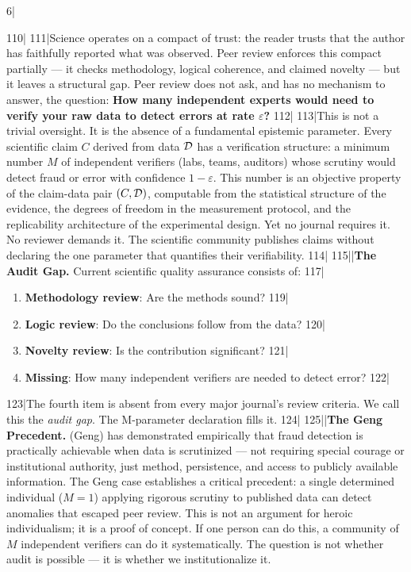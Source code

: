 6|\documentclass[12pt,a4paper]{article}
\begin{document}
110|
111|Science operates on a compact of trust: the reader trusts that the author has faithfully reported what was observed. Peer review enforces this compact partially — it checks methodology, logical coherence, and claimed novelty — but it leaves a structural gap. Peer review does not ask, and has no mechanism to answer, the question: \textbf{How many independent experts would need to verify your raw data to detect errors at rate $\varepsilon$?}
112|
113|This is not a trivial oversight. It is the absence of a fundamental epistemic parameter. Every scientific claim $C$ derived from data $\mathcal{D}$ has a verification structure: a minimum number $M$ of independent verifiers (labs, teams, auditors) whose scrutiny would detect fraud or error with confidence $1-\varepsilon$. This number is an objective property of the claim-data pair $(C, \mathcal{D})$, computable from the statistical structure of the evidence, the degrees of freedom in the measurement protocol, and the replicability architecture of the experimental design. Yet no journal requires it. No reviewer demands it. The scientific community publishes claims without declaring the one parameter that quantifies their verifiability.
114|
115||\noindent\textbf{The Audit Gap.} Current scientific quality assurance consists of:
117|\begin{enumerate}[label=(\roman*)]
118|    \item \textbf{Methodology review}: Are the methods sound?
119|    \item \textbf{Logic review}: Do the conclusions follow from the data?
120|    \item \textbf{Novelty review}: Is the contribution significant?
121|    \item \textbf{Missing}: How many independent verifiers are needed to detect error?
122|\end{enumerate}
123|The fourth item is absent from every major journal's review criteria. We call this the \textit{audit gap}. The M-parameter declaration fills it.
124|
125||\noindent\textbf{The Geng Precedent.}  (Geng) has demonstrated empirically that fraud detection is practically achievable when data is scrutinized — not requiring special courage or institutional authority, just method, persistence, and access to publicly available information. The Geng case establishes a critical precedent: a single determined individual ($M=1$) applying rigorous scrutiny to published data can detect anomalies that escaped peer review. This is not an argument for heroic individualism; it is a proof of concept. If one person can do this, a community of $M$ independent verifiers can do it systematically. The question is not whether audit is possible — it is whether we institutionalize it.
\end{document}
